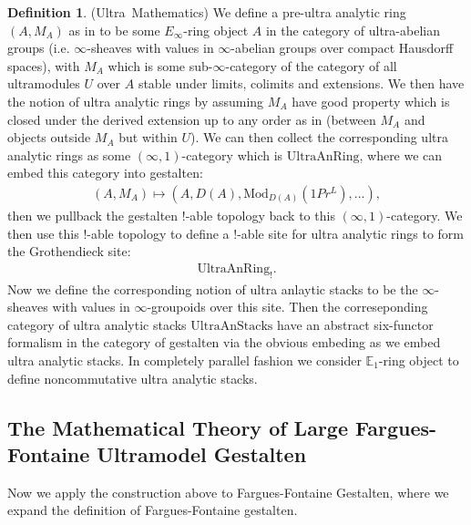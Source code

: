 \documentclass[12pt]{article}
\theoremstyle{definition}
\newtheorem{definition}{Definition}
\begin{document}
\begin{definition} \mbox{(Ultra Mathematics)}
We define a pre-ultra analytic ring $(A,M_A)$ as in \cite{CS1} to be some $E_\infty$-ring object $A$ in the category of ultra-abelian groups (i.e. $\infty$-sheaves with values in $\infty$-abelian groups over compact Hausdorff spaces), with $M_A$ which is some sub-$\infty$-category of the category of all ultramodules $U$ over $A$ stable under limits, colimits and extensions. We then have the notion of ultra analytic rings by assuming $M_A$ have good property which is closed under the derived extension up to any order as in \cite{CS1} (between $M_A$ and objects outside $M_A$ but within $U$). We can then collect the corresponding ultra analytic rings as some $(\infty,1)$-category which is $\mathrm{UltraAnRing}$, where we can embed this category into gestalten:
\begin{align}
(A,M_A)\mapsto (A,D(A),\mathrm{Mod}_{D(A)}(1Pr^L),...),
\end{align}
then we pullback the gestalten $!$-able topology back to this $(\infty,1)$-category. We then use this $!$-able topology to define a $!$-able site for ultra analytic rings to form the Grothendieck site:
\begin{align}
\mathrm{UltraAnRing}_!.
\end{align} 
Now we define the corresponding notion of ultra anlaytic stacks to be the $\infty$-sheaves with values in $\infty$-groupoids over this site. Then the correseponding category of ultra analytic stacks $\mathrm{UltraAnStacks}$ have an abstract six-functor formalism in the category of gestalten via the obvious embeding as we embed ultra analytic stacks. In completely parallel fashion we consider $\mathbb{E}_1$-ring object to define noncommutative ultra analytic stacks.
\end{definition}










\subsection{The Mathematical Theory of Large Fargues-Fontaine Ultramodel Gestalten}

\noindent Now we apply the construction above to Fargues-Fontaine Gestalten, where we expand the definition of Fargues-Fontaine gestalten.
\end{document}
